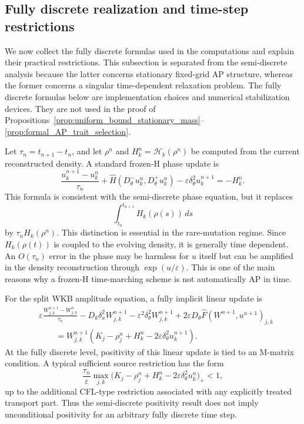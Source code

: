 \documentclass[11pt]{article}
\begin{document}
\subsection{{\color{red} Fully discrete realization and time-step restrictions}}
\label{subsec:fully_discrete_time}

{\color{red}
We now collect the fully discrete formulas used in the computations and explain their practical restrictions. This subsection is separated from the semi-discrete analysis because the latter concerns stationary fixed-grid AP structure, whereas the former concerns a singular time-dependent relaxation problem. The fully discrete formulas below are implementation choices and numerical stabilization devices. They are not used in the proof of Propositions~\ref{prop:uniform_bound_stationary_mass}--\ref{prop:formal_AP_trait_selection}.

Let \(\tau_n=t_{n+1}-t_n\), and let \(\rho^n\) and \(H^n_k=\mathcal H_k(\rho^n)\) be computed from the current reconstructed density. A standard frozen-H phase update is
\begin{equation}\label{eq:fully_phase_new}
    \frac{u_k^{n+1}-u_k^n}{\tau_n}
    +\widehat H(D_\theta^-u_k^n,D_\theta^+u_k^n)
    -\varepsilon\delta_\theta^2u_k^{n+1}
    =-H_k^n .
\end{equation}
This formula is consistent with the semi-discrete phase equation, but it replaces
\[
    \int_{t_n}^{t_{n+1}} H_k(\rho(s))\,ds
\]
by \(\tau_n H_k(\rho^n)\). This distinction is essential in the rare-mutation regime. Since \(H_k(\rho(t))\) is coupled to the evolving density, it is generally time dependent. An \(O(\tau_n)\) error in the phase may be harmless for \(u\) itself but can be amplified in the density reconstruction through \(\exp(u/\varepsilon)\). This is one of the main reasons why a frozen-H time-marching scheme is not automatically AP in time.

For the split WKB amplitude equation, a fully implicit linear update is
\begin{equation}\label{eq:fully_split_implicit_new}
\begin{aligned}
    &\varepsilon\frac{W_{j,k}^{n+1}-W_{j,k}^n}{\tau_n}
    -D_k\delta_x^2W_{j,k}^{n+1}
    -\varepsilon^2\delta_\theta^2W_{j,k}^{n+1}
    +2\varepsilon D_\theta\widehat F(W^{n+1},u^{n+1})_{j,k} \\
    &\qquad
    =W_{j,k}^{n+1}
    \left(K_j-\rho_j^n+H_k^n-2\varepsilon\delta_\theta^2u_k^{n+1}\right).
\end{aligned}
\end{equation}
At the fully discrete level, positivity of this linear update is tied to an M-matrix condition. A typical sufficient source restriction has the form
\begin{equation}\label{eq:split_source_restriction_new}
    \frac{\tau_n}{\varepsilon}
    \max_{j,k}\bigl(K_j-\rho_j^n+H_k^n-2\varepsilon\delta_\theta^2u_k^n\bigr)_+ < 1,
\end{equation}
up to the additional CFL-type restriction associated with any explicitly treated transport part. Thus the semi-discrete positivity result does not imply unconditional positivity for an arbitrary fully discrete time step.

}
\end{document}

